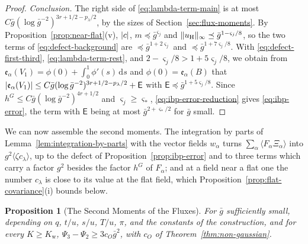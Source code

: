 \documentclass[11pt]{preprint}
\newcommand{\dd}{\mathrm{d}}
\DeclarePairedDelimiter{\abs}{\lvert}{\rvert}
\DeclarePairedDelimiter{\norm}{\lVert}{\rVert}
\numberwithin{equation}{section}
\newtheorem{proposition}[theorem]{Proposition}
\theoremstyle{definition}
\theoremstyle{remark}
\theoremstyle{plain}
\begin{document}
\begin{proof}
\emph{Conclusion.} The right side of \eqref{eq:lambda-term-main} is at most $C\bar g(\log\bar g^{-2})^{3r+1/2-p_\lambda/2}$, by the sizes of Section~\ref{sec:flux-moments}. By Proposition~\ref{prop:near-flat}(v), $\abs c$, $m \preceq \bar g^{\varsigma_j}$ and $\norm{u_{\mathrm H}}_\infty \preceq \bar g^{1-\varsigma_j/8}$, so the two terms of \eqref{eq:defect-background} are $\preceq \bar g^{1+2\varsigma_j}$ and $\preceq \bar g^{1+7\varsigma_j/8}$. With \eqref{eq:defect-first-third}, \eqref{eq:lambda-term-rest}, and $2 - \varsigma_j/8 > 1 + 5\varsigma_j/8$, we obtain from $\mathfrak e_\alpha(V_1) = \phi(0) + \int_0^1\phi'(s)\,\dd s$ and $\phi(0) = \mathfrak e_\alpha(B)$ that $\abs{\mathfrak e_\alpha(V_1)} \leq C\bar g(\log\bar g^{-2})^{3r+1/2-p_\lambda/2} + \mathsf E$ with $\mathsf E \preceq \bar g^{1+5\varsigma_j/8}$. Since $h^G \leq C\bar g(\log\bar g^{-2})^{4r+1/2}$ and $\varsigma_j \geq \varsigma_*$, \eqref{eq:ibp-error-reduction} gives \eqref{eq:ibp-error}, the term with $\mathsf E$ being at most $\bar g^{2+\varsigma_*/2}$ for $\bar g$ small.
\end{proof}

We can now assemble the second moments. The integration by parts of Lemma~\ref{lem:integration-by-parts} with the vector fields $w_\alpha$ turns $\sum_\alpha\langle F_\alpha\Xi_\alpha\rangle$ into $g^2\langle\zeta c_\lambda\rangle$, up to the defect of Proposition~\ref{prop:ibp-error} and to three terms which carry a factor $g^2$ besides the factor $h^G$ of $F_\alpha$; and at a field near a flat one the number $c_\lambda$ is close to its value at the flat field, which Proposition~\ref{prop:flat-covariance}(i) bounds below.

\begin{proposition}[The Second Moments of the Fluxes]\label{prop:flux-moments}
For $\bar g$ sufficiently small, depending on $q$, $t/u$, $s/u$, $T/u$, $\pi$, and the constants of the construction, and for every $K \geq K_{\mathrm w}$, $\Psi_3 - \Psi_2 \geq 3c_O\bar g^2$, with $c_O$ of Theorem~\ref{thm:non-gaussian}.
\end{proposition}
\end{document}
